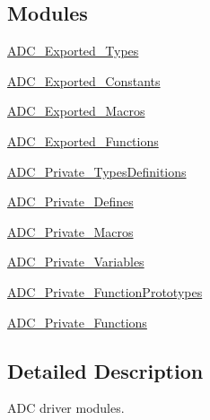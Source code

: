 \subsection*{Modules}
\begin{DoxyCompactItemize}
\item 
\hyperlink{group___a_d_c___exported___types}{A\+D\+C\+\_\+\+Exported\+\_\+\+Types}
\item 
\hyperlink{group___a_d_c___exported___constants}{A\+D\+C\+\_\+\+Exported\+\_\+\+Constants}
\item 
\hyperlink{group___a_d_c___exported___macros}{A\+D\+C\+\_\+\+Exported\+\_\+\+Macros}
\item 
\hyperlink{group___a_d_c___exported___functions}{A\+D\+C\+\_\+\+Exported\+\_\+\+Functions}
\item 
\hyperlink{group___a_d_c___private___types_definitions}{A\+D\+C\+\_\+\+Private\+\_\+\+Types\+Definitions}
\item 
\hyperlink{group___a_d_c___private___defines}{A\+D\+C\+\_\+\+Private\+\_\+\+Defines}
\item 
\hyperlink{group___a_d_c___private___macros}{A\+D\+C\+\_\+\+Private\+\_\+\+Macros}
\item 
\hyperlink{group___a_d_c___private___variables}{A\+D\+C\+\_\+\+Private\+\_\+\+Variables}
\item 
\hyperlink{group___a_d_c___private___function_prototypes}{A\+D\+C\+\_\+\+Private\+\_\+\+Function\+Prototypes}
\item 
\hyperlink{group___a_d_c___private___functions}{A\+D\+C\+\_\+\+Private\+\_\+\+Functions}
\end{DoxyCompactItemize}


\subsection{Detailed Description}
A\+DC driver modules. 

